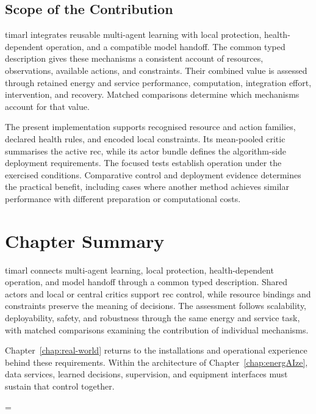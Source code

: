 \subsection{Scope of the Contribution}

\gls{timarl} integrates reusable multi-agent learning with local protection, health-dependent operation, and a compatible model handoff. The common typed description gives these mechanisms a consistent account of resources, observations, available actions, and constraints. Their combined value is assessed through retained energy and service performance, computation, integration effort, intervention, and recovery. Matched comparisons determine which mechanisms account for that value.

The present implementation supports recognised resource and action families, declared health rules, and encoded local constraints. Its mean-pooled critic summarises the active \gls{rec}, while its actor bundle defines the algorithm-side deployment requirements. The focused tests establish operation under the exercised conditions. Comparative control and deployment evidence determines the practical benefit, including cases where another method achieves similar performance with different preparation or computational costs.

\section{Chapter Summary}
\label{sec:timarl-summary}

\gls{timarl} connects multi-agent learning, local protection, health-dependent operation, and model handoff through a common typed description. Shared actors and local or central critics support \gls{rec} control, while resource bindings and constraints preserve the meaning of decisions. The assessment follows scalability, deployability, safety, and robustness through the same energy and service task, with matched comparisons examining the contribution of individual mechanisms.

Chapter~\ref{chap:real-world} returns to the installations and operational experience behind these requirements. Within the architecture of Chapter~\ref{chap:energAIze}, data services, learned decisions, supervision, and equipment interfaces must sustain that control together.

\postdisplaypenalty=\timarlpostdisplaypenalty\relax

